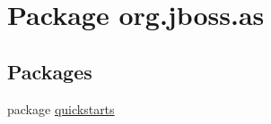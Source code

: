 \hypertarget{namespaceorg_1_1jboss_1_1as}{}\section{Package org.\+jboss.\+as}
\label{namespaceorg_1_1jboss_1_1as}
\subsection*{Packages}
\begin{DoxyCompactItemize}
\item 
package \hyperlink{namespaceorg_1_1jboss_1_1as_1_1quickstarts}{quickstarts}
\end{DoxyCompactItemize}
